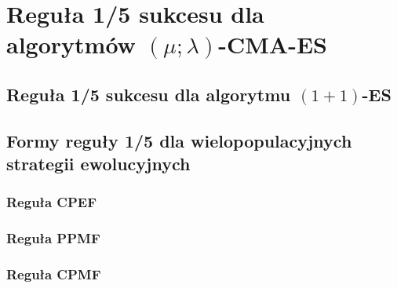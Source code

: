 \newpage

\section{Reguła 1/5 sukcesu dla algorytmów $(\mu ; \lambda)$-CMA-ES}
\label{sec:zasieg}
\subsection{Reguła 1/5 sukcesu dla algorytmu $(1+1)$-ES}
\subsection{Formy reguły 1/5 dla wielopopulacyjnych strategii ewolucyjnych}
\subsubsection{Reguła CPEF}
\subsubsection{Reguła PPMF}
\subsubsection{Reguła CPMF}
